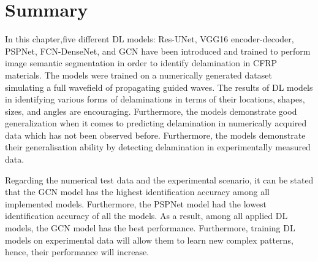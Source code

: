 \section*{Summary}
\label{conclusion}
In this chapter,five different DL models: Res-UNet, VGG16 encoder-decoder, PSPNet, FCN-DenseNet, and GCN have been introduced and trained to perform image semantic segmentation in order to identify delamination in CFRP materials.
The models were trained on a numerically generated dataset simulating a full wavefield of propagating guided waves.
The results of DL models in identifying various forms of delaminations in terms of their locations, shapes, sizes, and angles are encouraging.
Furthermore, the models demonstrate good generalization when it comes to predicting delamination in numerically acquired data which has not been observed before.
Furthermore, the models demonstrate their generalisation ability by detecting delamination in experimentally measured data.

Regarding the numerical test data and the experimental scenario, it can be stated that the GCN model has the highest identification accuracy among all implemented models.
Furthermore, the PSPNet model had the lowest identification accuracy of all the models.
As a result, among all applied DL models, the GCN model has the best performance.
Furthermore, training DL models on experimental data will allow them to learn new complex patterns, hence, their performance will increase.

